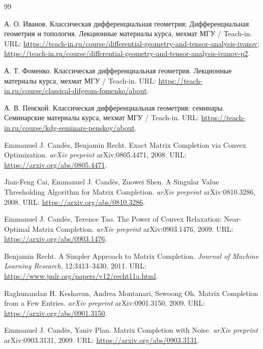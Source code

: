 \documentclass[a4paper,12pt]{article}
\begin{document}
\begin{thebibliography}{99}

А. О. Иванов.
\newblock Классическая дифференциальная геометрия; Дифференциальная геометрия и топология.
\newblock Лекционные материалы курса, мехмат МГУ / Teach-in.
\newblock URL: \url{https://teach-in.ru/course/differential-geometry-and-tensor-analysis-ivanov};
\url{https://teach-in.ru/course/differential-geometry-and-tensor-analysis-ivanov-p2}.

А. Т. Фоменко.
\newblock Классическая дифференциальная геометрия.
\newblock Лекционные материалы курса, мехмат МГУ / Teach-in.
\newblock URL: \url{https://teach-in.ru/course/classical-difgeom-fomenko/about}.

А. В. Пенской.
\newblock Классическая дифференциальная геометрия: семинары.
\newblock Семинарские материалы курса, мехмат МГУ / Teach-in.
\newblock URL: \url{https://teach-in.ru/course/kdg-seminars-penskoy/about}.

Emmanuel J. Cand\`es, Benjamin Recht.
\newblock Exact Matrix Completion via Convex Optimization.
\newblock \textit{arXiv preprint} arXiv:0805.4471, 2008.
\newblock URL: \url{https://arxiv.org/abs/0805.4471}.

Jian-Feng Cai, Emmanuel J. Cand\`es, Zuowei Shen.
\newblock A Singular Value Thresholding Algorithm for Matrix Completion.
\newblock \textit{arXiv preprint} arXiv:0810.3286, 2008.
\newblock URL: \url{https://arxiv.org/abs/0810.3286}.

Emmanuel J. Cand\`es, Terence Tao.
\newblock The Power of Convex Relaxation: Near-Optimal Matrix Completion.
\newblock \textit{arXiv preprint} arXiv:0903.1476, 2009.
\newblock URL: \url{https://arxiv.org/abs/0903.1476}.

Benjamin Recht.
\newblock A Simpler Approach to Matrix Completion.
\newblock \textit{Journal of Machine Learning Research}, 12:3413--3430, 2011.
\newblock URL: \url{https://www.jmlr.org/papers/v12/recht11a.html}.

Raghunandan H. Keshavan, Andrea Montanari, Sewoong Oh.
\newblock Matrix Completion from a Few Entries.
\newblock \textit{arXiv preprint} arXiv:0901.3150, 2009.
\newblock URL: \url{https://arxiv.org/abs/0901.3150}.

Emmanuel J. Cand\`es, Yaniv Plan.
\newblock Matrix Completion with Noise.
\newblock \textit{arXiv preprint} arXiv:0903.3131, 2009.
\newblock URL: \url{https://arxiv.org/abs/0903.3131}.


\end{thebibliography}
\end{document}
